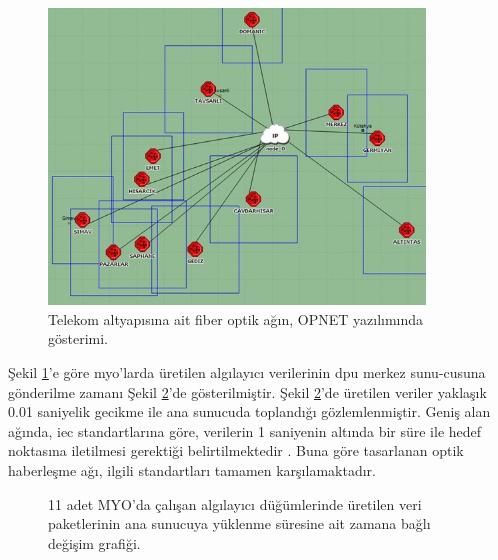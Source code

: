 \begin{figure}[htbp]
\centerline{\includegraphics[width=10cm]{Resim/sekil4-39.jpg}}
\caption{Telekom altyapısına ait fiber optik ağın, OPNET yazılımında gösterimi.}
\label{fig:4-39}
\end{figure}


Şekil \ref{fig:4-39}’e göre \gls{myo}'larda üretilen algılayıcı verilerinin \gls{dpu} merkez sunu-cusuna gönderilme zamanı Şekil \ref{fig:4-40}’de gösterilmiştir. Şekil \ref{fig:4-40}’de üretilen veriler yaklaşık 0.01 saniyelik gecikme ile ana sunucuda toplandığı gözlemlenmiştir. Geniş alan ağında, \gls{iec} standartlarına göre, verilerin 1 saniyenin altında bir süre ile hedef noktasına iletilmesi gerektiği belirtilmektedir \cite{mackiewicz2006overview}. Buna göre tasarlanan optik haberleşme ağı, ilgili standartları tamamen karşılamaktadır.

\begin{figure}[htbp]
\centering




\caption{11 adet MYO'da çalışan algılayıcı düğümlerinde üretilen veri paketlerinin ana sunucuya yüklenme süresine ait zamana bağlı değişim grafiği.}
\label{fig:4-40}
\end{figure}



